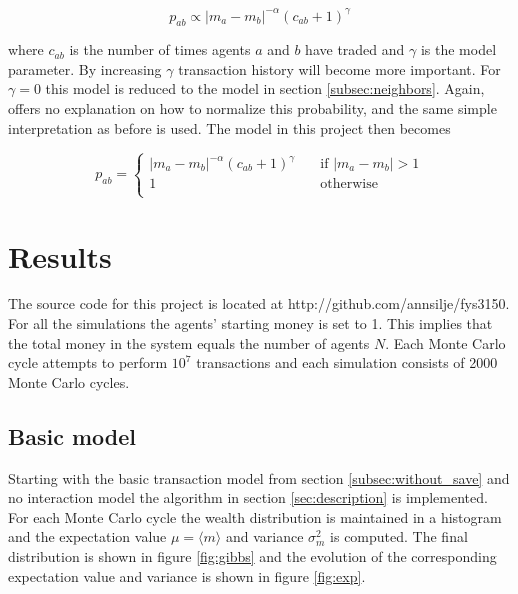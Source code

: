 \documentclass{article}
\begin{document}
\begin{equation}
p_{ab} \propto |m_a - m_b|^{-\alpha}(c_{ab} + 1)^{\gamma}
\end{equation}

\noindent where $c_{ab}$ is the number of times agents $a$ and $b$ have traded and $\gamma$ is the model parameter. By increasing $\gamma$ transaction history will become more important. For $\gamma=0$ this model is reduced to the model in section \ref{subsec:neighbors}. Again, \cite{interaction} offers no explanation on how to normalize this probability, and the same simple interpretation as before is used. The model in this project then becomes

\begin{equation}
p_{ab} = 
\begin{cases}
|m_a - m_b|^{-\alpha}(c_{ab} + 1)^{\gamma} & \quad \text{if } |m_a - m_b| > 1 \\
1                                          & \quad \text{otherwise } \\
\end{cases}
\end{equation}


\FloatBarrier
\section{Results}
\label{sec:results}
The source code for this project is located at http://github.com/annsilje/fys3150. For all the simulations the agents' starting money is set to 1. This implies that the total money in the system equals the number of agents $N$. Each Monte Carlo cycle attempts to perform $10^7$ transactions and each simulation consists of 2000 Monte Carlo cycles. 

\subsection{Basic model}
Starting with the basic transaction model from section \ref{subsec:without_save} and no interaction model the algorithm in section \ref{sec:description} is implemented. For each Monte Carlo cycle the wealth distribution is maintained in a histogram and the expectation value $\mu=\langle m \rangle$ and variance $\sigma_m^2$ is computed. The final distribution is shown in figure \ref{fig:gibbs} and the evolution of the corresponding  expectation value and variance is shown in figure \ref{fig:exp}. 
\end{document}

